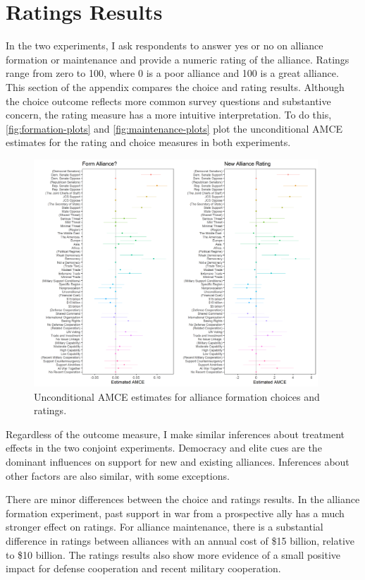 \documentclass[12pt]{article}
\begin{document}
\newpage


\section{Ratings Results}

In the two experiments, I ask respondents to answer yes or no on alliance formation or maintenance and provide a numeric rating of the alliance. 
Ratings range from zero to 100, where 0 is a poor alliance and 100 is a great alliance. 
This section of the appendix compares the choice and rating results. 
Although the choice outcome reflects more common survey questions and substantive concern, the rating measure has a more intuitive interpretation. 
To do this, \autoref{fig:formation-plots} and \autoref{fig:maintenance-plots} plot the unconditional AMCE estimates for the rating and choice measures in both experiments.  


\begin{figure}[htpb]
	\centering
		\includegraphics[width=0.95\textwidth]{formation-plots.png}
	\caption{Unconditional AMCE estimates for alliance formation choices and ratings.}
	\label{fig:formation-plots}
\end{figure}


Regardless of the outcome measure, I make similar inferences about treatment effects in the two conjoint experiments. 
Democracy and elite cues are the dominant influences on support for new and existing alliances. 
Inferences about other factors are also similar, with some exceptions. 


There are minor differences between the choice and ratings results. 
In the alliance formation experiment, past support in war from a prospective ally has a much stronger effect on ratings. 
For alliance maintenance, there is a substantial difference in ratings between alliances with an annual cost of \$15 billion, relative to \$10 billion. 
The ratings results also show more evidence of a small positive impact for defense cooperation and recent military cooperation. 
\end{document}
